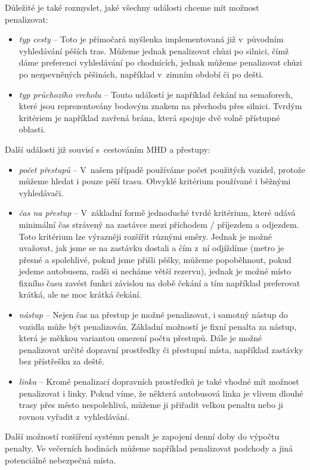 Důležité je také rozmyslet, jaké všechny události chceme mít možnost
penalizovat:
\begin{itemize}
	\item {\em typ cesty} -- Toto je přímočará myšlenka implementovaná již
v~původním vyhledávání pěších tras. Můžeme jednak penalizovat chůzi po
	silnici, čímž dáme preferenci vyhledávání po chodnících, jednak můžeme
	penalizovat chůzi po nezpevněných pěšinách, například v~zimním období či
	po dešti.
	\item {\em typ průchozího vrcholu} -- Touto událostí je například čekání
	na semaforech, které jsou reprezentovány bodovým znakem na přechodu přes
	silnici. Tvrdým kritériem je například zavřená brána, která spojuje dvě
	volně přístupné oblasti.
\end{itemize}
Další události již souvisí s~cestováním MHD a přestupy:
\begin{itemize}
	\item {\em počet přestupů} -- V~našem případě používáme počet použitých
	vozidel, protože můžeme hledat i pouze pěší trasu. Obvyklé kritérium
	používané i běžnými vyhledávači.
	\item {\em čas na přestup} -- V~základní formě jednoduché
	tvrdé kritérium, které udává minimální čas strávený na zastávce mezi
	příchodem / příjezdem a odjezdem. Toto kritérium lze výrazněji rozšířit
	různými směry. Jednak je možné uvažovat, jak jsme se na zastávku dostali
	a čím z~ní odjíždíme (metro je přesné a spolehlivé, pokud jsme přišli
	pěšky, můžeme popoběhnout, pokud jedeme autobusem, radši si necháme
	větší rezervu), jednak je možné místo fixního času zavést funkci
	závislou na době čekání a tím například preferovat krátká, ale ne moc
	krátká čekání. 
	\item {\em nástup} -- Nejen čas na přestup je možné penalizovat, i
	samotný nástup do vozidla může být penalizován. Základní možností je
	fixní penalta za nástup, která je měkkou variantou omezení počtu
	přestupů. Dále je možné penalizovat určité dopravní prostředky či přestupní
	místa, například zastávky bez přístřešku za deště. 
	\item {\em linka} -- Kromě penalizací dopravních prostředků je také
	vhodné mít možnost penalizovat i linky. Pokud víme, že některá
	autobusová linka je vlivem dlouhé trasy přes město nespolehlivá, můžeme
	ji přiřadit velkou penaltu nebo ji rovnou vyřadit z~vyhledávání. 
\end{itemize}

Další možností rozšíření systému penalt je zapojení denní doby do výpočtu
penalty. Ve večerních hodinách můžeme například penalizovat podchody a jiná
potenciálně nebezpečná místa.


